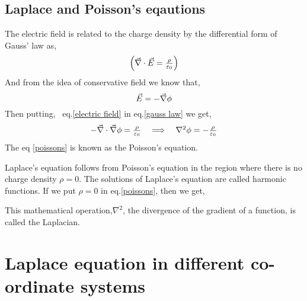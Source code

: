 \begin{answer}
	
\end{answer}
\subsection{Laplace and Poisson's eqautions}
The electric field is related to the charge density by the  differential form of Gauss' law as,
\begin{equation}
$$\left(\vec{\nabla} \cdot \vec{E}=\frac{\rho}{\varepsilon_{0}}\right)$$\label{gauss law}
\end{equation}
And from the idea of conservative field we know that,\begin{equation}
$$\vec{E}=-\vec{\nabla} \phi\label{electric field}$$
\end{equation} 
Then putting, \ eq.\ref{electric field} in eq.\ref{gauss law} we get,
\begin{equation}
$$-\vec{\nabla} \cdot \vec{\nabla} \phi=\frac{\rho}{\varepsilon_{0}}\quad \Longrightarrow \quad \nabla^{2} \phi=-\frac{\rho}{\varepsilon_{0}}\label{poissons} $$
\end{equation}
The eq \ref{poissons} is known as the Poisson's equation. 
\begin{center}
\end{center}
Laplace's equation follows from Poisson's equation in the region where there is no charge density $\rho=0 .$ The solutions of Laplace's equation are called harmonic functions. If we put $\rho=0$ in eq.\ref{poissons},  then we get,
\begin{center}
\end{center}
\begin{note}
This mathematical operation,$ \nabla^{2}$, the divergence of the gradient of a function, is called the Laplacian.
\end{note}
\section{Laplace equation in different co-ordinate systems}

